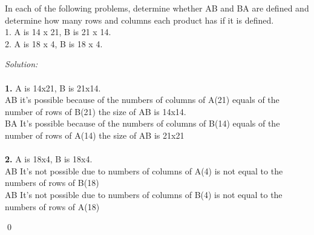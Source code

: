 \documentclass[12pt]{article}
\newenvironment{problem}[2][Problem]{\begin{trivlist}
\item[\hskip \labelsep {\bfseries #1}\hskip \labelsep {\bfseries #2.}]}{\end{trivlist}}
\newenvironment{sol}
    {\emph{Solution:}
    }
    {
    \qed
    }
\begin{document}
\begin{problem}{V}
In each of the following problems, determine whether AB and BA are defined and determine how many rows and columns each product has if it is defined.\\
1. A is 14 x 21, B is 21 x 14.\\
2. A is 18 x 4, B is 18 x 4.
\end{problem}
\begin{sol}\\ \\
{\bfseries 1.} A is 14x21, B is 21x14.
\\AB it's possible because of the numbers of columns of A(21) equals of the number of rows of B(21) the size of AB is 14x14.
\\BA It's possible because of the numbers of columns of B(14) equals of the number of rows of A(14) the size of AB is 21x21 \\
\\{\bfseries 2.} A is 18x4, B is 18x4.
\\AB It's not possible due to numbers of columns of A(4) is not equal to the numbers of rows of B(18) 
\\AB It's not possible due to numbers of columns of B(4) is not equal to the numbers of rows of A(18) 
\end{sol}
\end{document}
